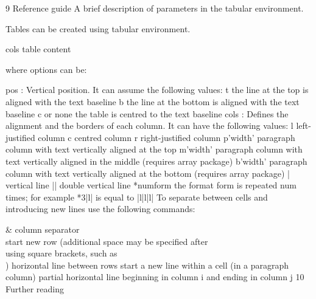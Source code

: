 9 Reference guide
A brief description of parameters in the tabular environment.

Tables can be created using tabular environment.

\begin{tabular}[pos]{cols}
 table content
\end{tabular}
where options can be:

pos : Vertical position. It can assume the following values:
t	the line at the top is aligned with the text baseline
b	the line at the bottom is aligned with the text baseline
c or none	the table is centred to the text baseline
cols : Defines the alignment and the borders of each column. It can have the following values:
l	left-justified column
c	centred column
r	right-justified column
p{'width'}	paragraph column with text vertically aligned at the top
m{'width'}	paragraph column with text vertically aligned in the middle (requires array package)
b{'width'}	paragraph column with text vertically aligned at the bottom (requires array package)
|	vertical line
||	double vertical line
*{num}{form}	the format form is repeated num times; for example *{3}{|l}| is equal to |l|l|l|
To separate between cells and introducing new lines use the following commands:

&	column separator
\\	start new row (additional space may be specified after \\ using square brackets, such as \\[6pt])
\hline	horizontal line between rows
\newline	start a new line within a cell (in a paragraph column)
	partial horizontal line beginning in column i and ending in column j
10 Further reading



























